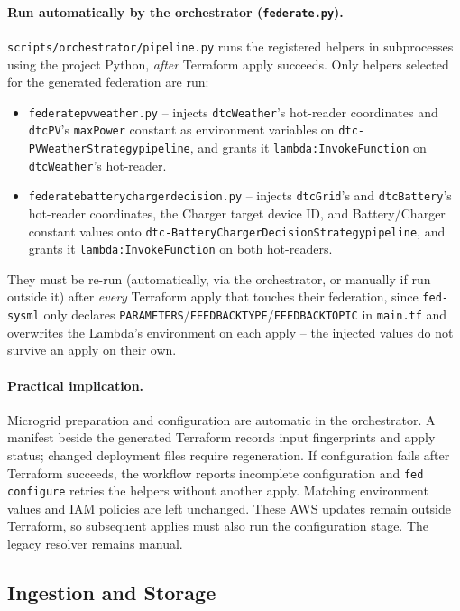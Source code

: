 \documentclass[11pt]{article}
\renewcommand{\_}{\textunderscore\allowbreak}
\begin{document}
\paragraph{Run automatically by the orchestrator (\texttt{federate\_*.py}).}
\texttt{scripts/orchestrator/pipeline.py} runs the registered helpers in
subprocesses using the project Python, \emph{after} Terraform apply succeeds.
Only helpers selected for the generated federation are run:
\begin{itemize}[nosep]
  \item \texttt{federate\_pv\_weather.py} -- injects
        \texttt{dtcWeather}'s hot-reader coordinates and \texttt{dtcPV}'s
        \texttt{maxPower} constant as environment variables on
        \texttt{dtc-PVWeatherStrategy\_pipeline}, and grants it
        \texttt{lambda:InvokeFunction} on \texttt{dtcWeather}'s hot-reader.
  \item \texttt{federate\_battery\_charger\_decision.py} -- injects
        \texttt{dtcGrid}'s and \texttt{dtcBattery}'s hot-reader coordinates,
        the Charger target device ID, and Battery/Charger constant values
        onto \texttt{dtc-BatteryChargerDecisionStrategy\_pipeline}, and
        grants it \texttt{lambda:InvokeFunction} on both hot-readers.
\end{itemize}
They must be re-run (automatically, via the orchestrator, or manually if run
outside it) after \emph{every} Terraform apply that touches their
federation, since \texttt{fed-sysml} only declares
\texttt{PARAMETERS}/\texttt{FEEDBACK\_TYPE}/\texttt{FEEDBACK\_TOPIC} in
\texttt{main.tf} and overwrites the Lambda's environment on each apply --
the injected values do not survive an apply on their own.

\paragraph{Practical implication.} Microgrid preparation and configuration
are automatic in the orchestrator. A manifest beside the generated Terraform
records input fingerprints and apply status; changed deployment files require
regeneration. If configuration fails after Terraform succeeds, the workflow
reports incomplete configuration and \texttt{fed configure} retries the helpers
without another apply. Matching environment values and IAM policies are left
unchanged. These AWS updates remain outside Terraform, so subsequent applies
must also run the configuration stage. The legacy resolver remains manual.

\subsection{Ingestion and Storage}
\end{document}
